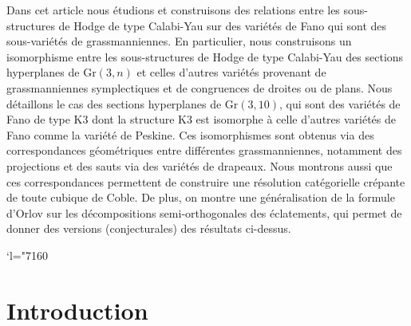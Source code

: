 \documentclass[JEP,XML,SOM,Unicode,NoEqCountersInSection]{cedram}
\newcommand{\Changel}{\mathcode`l="7160}
\theoremstyle{plain}
\theoremstyle{definition}
\begin{document}

\begin{altabstract}
Dans cet article nous étudions et construisons des relations entre les sous-structures de Hodge de type Calabi-Yau sur des variétés de Fano qui sont des sous-variétés de grassmanniennes. En particulier, nous construisons un isomorphisme entre les sous-structures de Hodge de type Calabi-Yau des sections hyperplanes de $\mathrm{Gr}(3,n)$ et celles d'autres variétés provenant de grassmanniennes symplectiques et de congruences de droites ou de plans. Nous détaillons le cas des sections hyperplanes de $\mathrm{Gr}(3,10)$, qui sont des variétés de Fano de type K3 dont la structure K3 est isomorphe à celle d'autres variétés de Fano comme la variété de Peskine. Ces isomorphismes sont obtenus via des correspondances géométriques entre différentes grassmanniennes, notamment des projections et des sauts via des variétés de drapeaux. Nous montrons aussi que ces correspondances permettent de construire une résolution catégorielle crépante de toute cubique de Coble. De plus, on montre une généralisation de la formule d'Orlov sur les décompositions semi-orthogonales des éclatements, qui permet de donner des versions (conjecturales) des résultats ci-dessus.
\end{altabstract}

\maketitle
\vspace*{-\baselineskip}\enlargethispage{\baselineskip}%
\tableofcontents
\mainmatter
\Changel

\section{Introduction}
\end{document}
